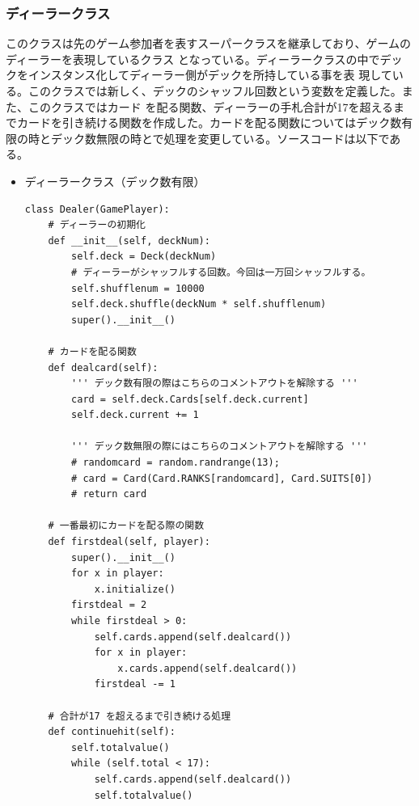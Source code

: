 \subsubsection{ディーラークラス}
このクラスは先のゲーム参加者を表すスーパークラスを継承しており、ゲームのディーラーを表現しているクラス
となっている。ディーラークラスの中でデックをインスタンス化してディーラー側がデックを所持している事を表
現している。このクラスでは新しく、デックのシャッフル回数という変数を定義した。また、このクラスではカード
を配る関数、ディーラーの手札合計が17を超えるまでカードを引き続ける関数を作成した。カードを配る関数についてはデック数有限の時とデック数無限の時とで処理を変更している。ソースコードは以下である。
\begin{itemize}
\item ディーラークラス（デック数有限）
\begin{lstlisting}
class Dealer(GamePlayer):
    # ディーラーの初期化
    def __init__(self, deckNum):
        self.deck = Deck(deckNum)
        # ディーラーがシャッフルする回数。今回は一万回シャッフルする。
        self.shufflenum = 10000
        self.deck.shuffle(deckNum * self.shufflenum)
        super().__init__()

    # カードを配る関数
    def dealcard(self):
        ''' デック数有限の際はこちらのコメントアウトを解除する '''
        card = self.deck.Cards[self.deck.current]
        self.deck.current += 1
        
        ''' デック数無限の際にはこちらのコメントアウトを解除する '''
        # randomcard = random.randrange(13);
        # card = Card(Card.RANKS[randomcard], Card.SUITS[0])
        # return card

    # 一番最初にカードを配る際の関数
    def firstdeal(self, player):
        super().__init__()
        for x in player:
            x.initialize()
        firstdeal = 2
        while firstdeal > 0:
            self.cards.append(self.dealcard())
            for x in player:
                x.cards.append(self.dealcard())
            firstdeal -= 1

    # 合計が17 を超えるまで引き続ける処理
    def continuehit(self):
        self.totalvalue()
        while (self.total < 17):
            self.cards.append(self.dealcard())
            self.totalvalue()

\end{lstlisting}
\end{itemize}

